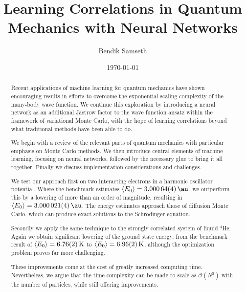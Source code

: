\documentclass[twoside,english]{uiofysmaster}
\author{Bendik Samseth}
\title{Learning Correlations in Quantum Mechanics with Neural Networks}
\date{\monthyeardate\today}
\begin{document}
\maketitle

\begin{abstract}
Recent applications of machine learning for quantum mechanics have shown
encouraging results in efforts to overcome the exponential scaling complexity of
the many-body wave function. We continue this exploration by introducing a
neural network as an additional Jastrow factor to the wave function ansatz
within the framework of variational Monte Carlo, with the hope of learning
correlations beyond what traditional methods have been able to do.

We begin with a review of the relevant parts of quantum mechanics with particular
emphasis on Monte Carlo methods. We then introduce central elements of machine
learning, focusing on neural networks, followed by the necessary glue to bring
it all together. Finally we discuss implementation considerations and challenges.

We test our approach first on two interacting electrons in a harmonic oscillator
potential. Where the benchmark estimates $\expval{E_0}=\SI{3.00064(4)}{\au}$, we
outperform this by a lowering of more than an order of magnitude, resulting in
$\expval{E_0}=\SI{3.000021(4)}{\au}$. The energy estimates approach those of
diffusion Monte Carlo, which can produce exact solutions to the Schrödinger equation.

Secondly we apply the same technique to the strongly correlated system of liquid
$^4$He. Again we obtain significant lowering of the ground state energy, from
the benchmark result of $\expval{E_0}=\SI{6.76(2)}{\kelvin}$ to
$\expval{E_0}=\SI{6.96(2)}{\kelvin}$, although the optimization problem proves far
more challenging.

These improvements come at the cost of greatly increased computing time.
Nevertheless, we argue that the time complexity can be made to scale as
$\mathcal{O}(N^2)$ with the number of particles, while still offering improvements.
\end{abstract}
\end{document}
